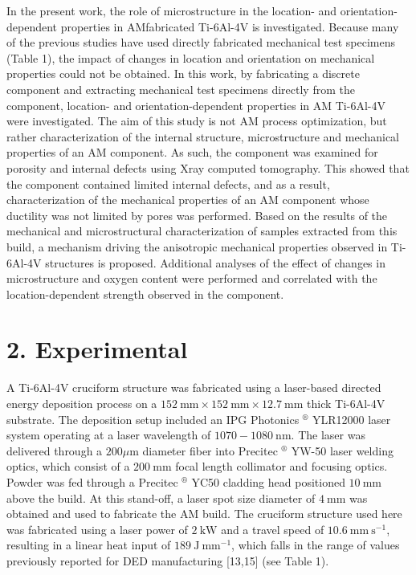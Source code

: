 \documentclass[10pt]{article}
\begin{document}
In the present work, the role of microstructure in the location- and orientation-dependent properties in AMfabricated Ti-6Al-4V is investigated. Because many of the previous studies have used directly fabricated mechanical test specimens (Table 1), the impact of changes in location and orientation on mechanical properties could not be obtained. In this work, by fabricating a discrete component and extracting mechanical test specimens directly from the component, location- and orientation-dependent properties in AM Ti-6Al-4V were investigated. The aim of this study is not AM process optimization, but rather characterization of the internal structure, microstructure and mechanical properties of an AM component. As such, the component was examined for porosity and internal defects using Xray computed tomography. This showed that the component contained limited internal defects, and as a result, characterization of the mechanical properties of an AM component whose ductility was not limited by pores was performed. Based on the results of the mechanical and microstructural characterization of samples extracted from this build, a mechanism driving the anisotropic mechanical properties observed in Ti-6Al-4V structures is proposed. Additional analyses of the effect of changes in microstructure and oxygen content were performed and correlated with the location-dependent strength observed in the component.

\section*{2. Experimental}
A Ti-6Al-4V cruciform structure was fabricated using a laser-based directed energy deposition process on a $152 \mathrm{~mm} \times 152 \mathrm{~mm} \times 12.7 \mathrm{~mm}$ thick Ti-6Al-4V substrate. The deposition setup included an IPG Photonics ${ }^{\circledR}$ YLR12000 laser system operating at a laser wavelength of $1070-1080 \mathrm{~nm}$. The laser was delivered through a $200 \mu \mathrm{m}$ diameter fiber into Precitec ${ }^{\circledR}$ YW-50 laser welding optics, which consist of a $200 \mathrm{~mm}$ focal length collimator and focusing optics. Powder was fed through a Precitec ${ }^{\circledR}$ YC50 cladding head positioned $10 \mathrm{~mm}$ above the build. At this stand-off, a laser spot size diameter of $4 \mathrm{~mm}$ was obtained and used to fabricate the AM build. The cruciform structure used here was fabricated using a laser power of $2 \mathrm{~kW}$ and a travel speed of $10.6 \mathrm{~mm} \mathrm{~s}^{-1}$, resulting in a linear heat input of $189 \mathrm{~J} \mathrm{~mm}^{-1}$, which falls in the range of values previously reported for DED manufacturing [13,15] (see Table 1).
\end{document}
